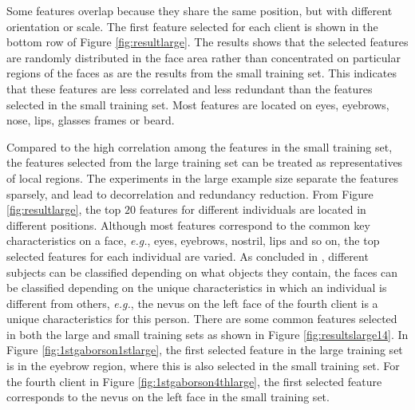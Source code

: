 Some features overlap because they share the same position, but with different orientation or scale. The first feature selected for each client is shown in the bottom row of \mbox{Figure} \ref{fig:resultlarge}. The results shows that the selected features are randomly distributed in the face area rather than concentrated on particular regions of the faces as are the results from the small training set. This indicates that these features are less correlated and less redundant than the features selected in the small training set. Most features are located on eyes, eyebrows, nose, lips, glasses frames or beard. 

Compared to the high correlation among the features in the small training set, the features selected from the large training set can be treated as representatives of local regions. The experiments in the large example size separate the features sparsely, and lead to decorrelation and redundancy reduction. From \mbox{Figure} \ref{fig:resultlarge}, the top $20$ features for different individuals are located in different positions. Although most features correspond to the common key characteristics on a face, \textit{e.g.}, eyes, eyebrows, nostril, lips and so on, the top selected features for each individual are varied. As concluded in \cite{Penev1996}, different subjects can be classified depending on what objects they contain, the faces can be classified depending on the unique characteristics in which an individual is different from others, \textit{e.g.}, the nevus on the left face of the fourth client is a unique characteristics for this person. There are some common features selected in both the large and small training sets as shown in \mbox{Figure} \ref{fig:resultslarge14}. In \mbox{Figure} \ref{fig:1stgaborson1stlarge}, the first selected feature in the large training set is in the eyebrow region, where this is also selected in the small training set. For the fourth client in \mbox{Figure} \ref{fig:1stgaborson4thlarge}, the first selected feature corresponds to the nevus on the left face in the small training set. 
